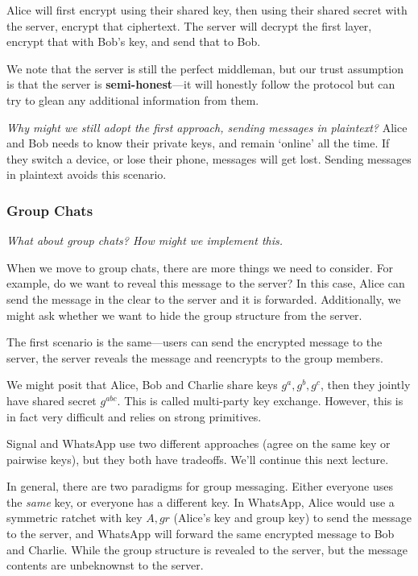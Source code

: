 Alice will first encrypt using their shared key, then using their shared secret with the server, encrypt that ciphertext. The server will decrypt the first layer, encrypt that with Bob's key, and send that to Bob.

We note that the server is still the perfect middleman, but our trust assumption is that the server is \textbf{semi-honest}---it will honestly follow the protocol but can try to glean any additional information from them.


\emph{Why might we still adopt the first approach, sending messages in plaintext?} Alice and Bob needs to know their private keys, and remain `online' all the time. If they switch a device, or lose their phone, messages will get lost. Sending messages in plaintext avoids this scenario.

\subsubsection{Group Chats}
\emph{What about group chats? How might we implement this.}

When we move to group chats, there are more things we need to consider. For example, do we want to reveal this message to the server? In this case, Alice can send the message in the clear to the server and it is forwarded. Additionally, we might ask whether we want to hide the group structure from the server.


The first scenario is the same---users can send the encrypted message to the server, the server reveals the message and reencrypts to the group members.

We might posit that Alice, Bob and Charlie share keys $g^a, g^b, g^c$, then they jointly have shared secret $g^{abc}$. This is called multi-party key exchange. However, this is in fact very difficult and relies on strong primitives.

Signal and WhatsApp use two different approaches (agree on the same key or pairwise keys), but they both have tradeoffs. We'll continue this next lecture.

In general, there are two paradigms for group messaging. Either everyone uses the \emph{same} key, or everyone has a different key. In WhatsApp, Alice would use a symmetric ratchet with key $A, gr$ (Alice's key and group key) to send the message to the server, and WhatsApp will forward the same encrypted message to Bob and Charlie. While the group structure is revealed to the server, but the message contents are unbeknownst to the server.

